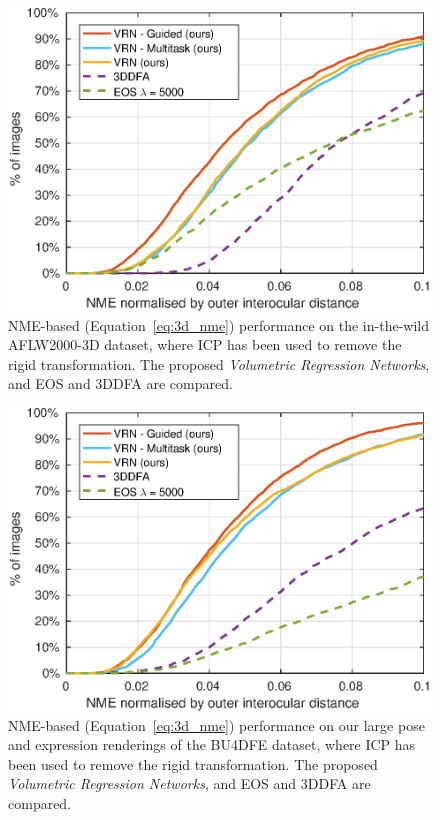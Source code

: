 \begin{figure}
  \centering
  \includegraphics[width=0.75\linewidth]{curves-icp/aflw.eps}
  \caption[NME performance on AFLW2000-3D with ICP
  Alignment]{NME-based (Equation~\ref{eq:3d_nme}) performance on the
    in-the-wild AFLW2000-3D dataset, where ICP has been used to remove
    the rigid transformation. The proposed \textit{Volumetric
      Regression Networks}, and EOS and 3DDFA are compared.}
  \label{roc:aflw2000icp}
\end{figure}

\begin{figure}
  \centering
  \includegraphics[width=0.75\linewidth]{curves-icp/bu4dfe.eps}
  \caption[NME performance on BU4DFE with ICP Alignment]{NME-based
    (Equation~\ref{eq:3d_nme}) performance on our large pose and
    expression renderings of the BU4DFE dataset, where ICP has been
    used to remove the rigid transformation. The proposed
    \textit{Volumetric Regression Networks}, and EOS and 3DDFA are
    compared.}
  \label{roc:bu4dfeicp}
\end{figure}


